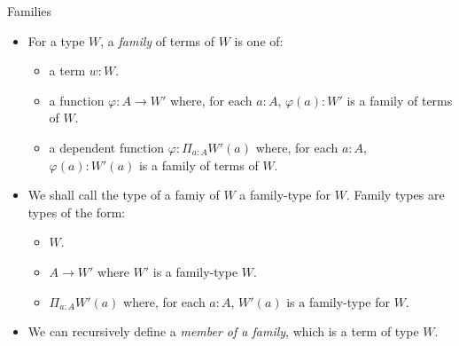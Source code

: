 \documentclass[10 pt., handout]{beamer}
\theoremstyle{plain}
\theoremstyle{remark}
\begin{document}
\begin{frame}{Families}

\begin{itemize}

\item For a type $W$, a \emph{family}  of terms of $W$ is one of:
\begin{itemize}
\item a term $w : W$.
\item a function $\varphi : A \to W'$ where, for each $a : A$,  $\varphi(a) : W'$ is a family of terms of $W$.
\item a dependent function $\varphi : \Pi_{a : A} W'(a)$ where, for each $a : A$, $\varphi(a) : W'(a)$ is a family of terms of $W$.
\end{itemize}

\item We shall call the type of a famiy of $W$ a family-type for $W$. Family types are types of the form:
\begin{itemize}
\item $W$.
\item $A \to W'$ where $W'$ is a family-type $W$.
\item $\Pi_{a : A} W'(a)$ where, for each $a : A$, $W'(a)$ is a family-type for $W$.
\end{itemize}

\item We can recursively define a \emph{member of a family}, which is a term of type $W$.

\end{itemize}


\end{frame}
\end{document}

